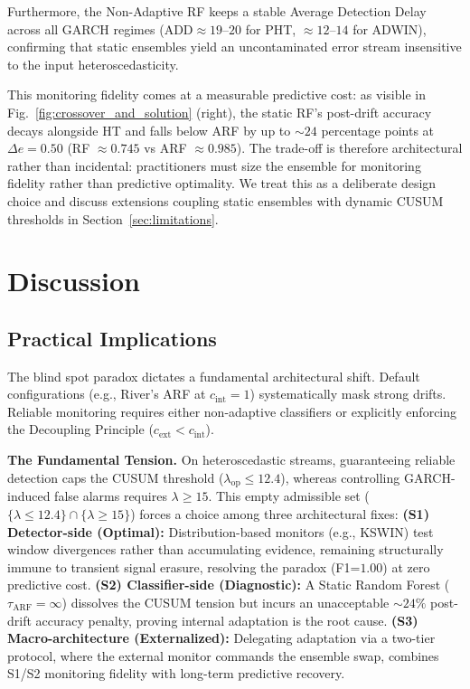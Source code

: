 \documentclass[10pt,conference]{IEEEtran}
\theoremstyle{definition}
\begin{document}
Furthermore, the Non-Adaptive RF keeps a stable Average Detection Delay across all GARCH regimes ($\mathrm{ADD} \approx 19$--$20$ for PHT, $\approx 12$--$14$ for ADWIN), confirming that static ensembles yield an uncontaminated error stream insensitive to the input heteroscedasticity.

This monitoring fidelity comes at a measurable predictive cost: as visible in Fig.~\ref{fig:crossover_and_solution} (right), the static RF's post-drift accuracy decays alongside HT and falls below ARF by up to $\sim 24$ percentage points at $\Delta e = 0.50$ (RF $\approx 0.745$ vs ARF $\approx 0.985$). The trade-off is therefore architectural rather than incidental: practitioners must size the ensemble for monitoring fidelity rather than predictive optimality. We treat this as a deliberate design choice and discuss extensions coupling static ensembles with dynamic CUSUM thresholds in Section~\ref{sec:limitations}.

\section{Discussion}\label{sec:discussion}

\subsection{Practical Implications}
The blind spot paradox dictates a fundamental architectural shift. Default configurations (e.g., River's ARF at $c_{\mathrm{int}} = 1$) systematically mask strong drifts. Reliable monitoring requires either non-adaptive classifiers or explicitly enforcing the Decoupling Principle ($c_{\mathrm{ext}} < c_{\mathrm{int}}$).

\textbf{The Fundamental Tension.} On heteroscedastic streams, guaranteeing reliable detection caps the CUSUM threshold ($\lambda_{\mathrm{op}} \le 12.4$), whereas controlling GARCH-induced false alarms requires $\lambda \ge 15$. This empty admissible set ($\{\lambda \le 12.4\} \cap \{\lambda \ge 15\}$) forces a choice among three architectural fixes:
\textbf{(S1) Detector-side (Optimal):} Distribution-based monitors (e.g., KSWIN) test window divergences rather than accumulating evidence, remaining structurally immune to transient signal erasure, resolving the paradox (F1=$1.00$) at zero predictive cost.
\textbf{(S2) Classifier-side (Diagnostic):} A Static Random Forest ($\tau_{\mathrm{ARF}} = \infty$) dissolves the CUSUM tension but incurs an unacceptable ${\sim}24\%$ post-drift accuracy penalty, proving internal adaptation is the root cause.
\textbf{(S3) Macro-architecture (Externalized):} Delegating adaptation via a two-tier protocol, where the external monitor commands the ensemble swap, combines S1/S2 monitoring fidelity with long-term predictive recovery.
\end{document}

